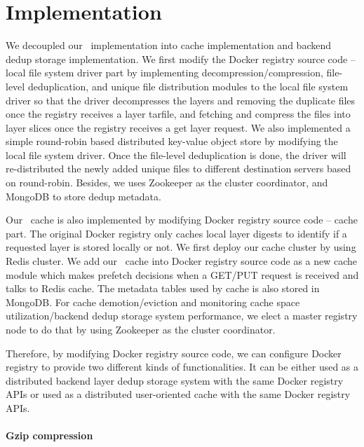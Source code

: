 \section{Implementation}
\label{sec:impl}
We decoupled our \sysname~implementation into cache implementation and backend dedup storage implementation. 
We first modify the Docker registry source code -- local file system driver part by implementing decompression/compression, file-level deduplication, and 
unique file distribution modules to the local file system driver so that the driver decompresses the layers and removing the duplicate files once the registry receives a layer tarfile, and fetching and compress the files into layer slices once the registry receives a get layer request. 
We also implemented a simple round-robin based distributed key-value object store by modifying the local file system driver. 
Once the file-level deduplication is done, the driver will re-distributed the newly added unique files to different destination servers based on round-robin. 
Besides, we uses Zookeeper as the cluster coordinator, and MongoDB to store dedup metadata.

Our \sysname~cache is also implemented by modifying Docker registry source code -- cache part. 
The original Docker registry only caches local layer digests to identify if a requested layer is stored locally or not. 
We first deploy our cache cluster by using Redis cluster. 
We add our \sysname~cache into Docker registry source code as a new cache module which makes prefetch decisions when a GET/PUT request is received and talks to Redis cache. The metadata tables used by cache is also stored in MongoDB. For cache demotion/eviction and monitoring cache space utilization/backend dedup storage system performance, we elect a master registry node to do that by using Zookeeper as the cluster coordinator. 

Therefore, by modifying Docker registry source code, we can configure Docker registry to provide two different kinds of functionalities. It can be either used as a distributed backend layer dedup storage system with the same Docker registry APIs or used as a distributed user-oriented cache with the same Docker registry APIs.

\paragraph{Gzip compression}